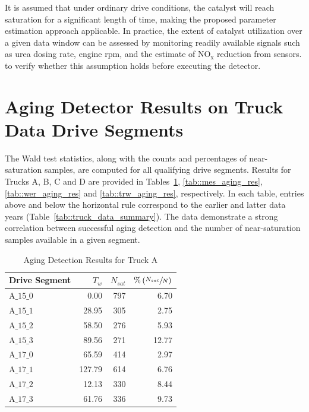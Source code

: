 \documentclass[subscriptcorrection,upint,varvw,barcolor=Goldenrod3,mathalfa=cal=euler,balance,hyphenate,french,pdf-a]{asmejour}
\newcommand{\lr}[1]{\left( #1 \right)}
\newcommand{\nox}{\text{NO}_{\text{x}}}
\begin{document}
It is assumed that under ordinary drive conditions, the catalyst will reach saturation for a significant length of time, making the proposed parameter estimation approach applicable. In practice, the extent of catalyst utilization over a given data window can be assessed by monitoring readily available signals such as urea dosing rate, engine rpm, and the estimate of $\nox$ reduction from sensors. to verify whether this assumption holds before executing the detector.
\section{Aging Detector Results on Truck Data Drive Segments}
The Wald test statistics, along with the counts and percentages of near-saturation samples, are computed for all qualifying drive segments. Results for Trucks A, B, C and D are provided in Tables~\ref{tab::adt_aging_res}, \ref{tab::mes_aging_res}, \ref{tab::wer_aging_res} and \ref{tab::trw_aging_res}, respectively. In each table, entries above and below the horizontal rule correspond to the earlier and latter data years (Table~\ref{tab::truck_data_summary}). The data demonstrate a strong correlation between successful aging detection and the number of near-saturation samples available in a given segment.
\begin{table}[H]
        \centering
        \caption{Aging Detection Results for Truck A}
        \label{tab::adt_aging_res}
        \begin{tabular}{l r r r}
                \hline \hline
                Drive Segment & $T_w$  & $N_{sat}$ & $\% \lr{ \sfrac{N_{sat}}{N} }$ \\ \hline \hline
                A$\_15\_0$    & 0.00   & 797       & 6.70                           \\
                A$\_15\_1$    & 28.95  & 305       & 2.75                           \\
                A$\_15\_2$    & 58.50  & 276       & 5.93                           \\
                A$\_15\_3$    & 89.56  & 271       & 12.77                          \\ \hline
                A$\_17\_0$    & 65.59  & 414       & 2.97                           \\
                A$\_17\_1$    & 127.79 & 614       & 6.76                           \\
                A$\_17\_2$    & 12.13  & 330       & 8.44                           \\
                A$\_17\_3$    & 61.76  & 336       & 9.73                           \\
                \hline \hline
        \end{tabular}
\end{table}
\end{document}
